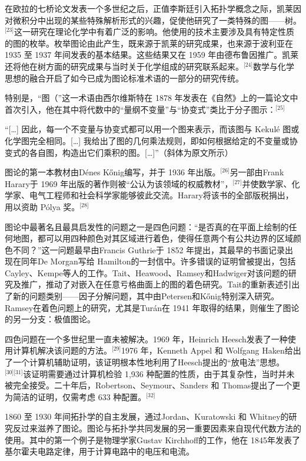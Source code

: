 在欧拉的七桥论文发表一个多世纪之后，正值李斯廷引入拓扑学概念之际，凯莱因对微积分中出现的某些特殊解析形式的兴趣，促使他研究了一类特殊的图——树。\(^\text{[23]}\)这一研究在理论化学中有着广泛的影响。他使用的技术主要涉及具有特定性质的图的枚举。枚举图论由此产生，既来源于凯莱的研究成果，也来源于波利亚在 1935 至 1937 年间发表的基本结果。这些结果又在 1959 年由德布鲁因推广。凯莱还将他在树方面的研究成果与当时关于化学组成的研究联系起来。\(^\text{[24]}\)数学与化学思想的融合开启了如今已成为图论标准术语的一部分的研究传统。

特别是，“图（”这一术语由西尔维斯特在 1878 年发表在《自然》上的一篇论文中首次引入，他在其中将代数中的“量纲不变量”与“协变式”类比于分子图示：\(^\text{[25]}\)

“[…] 因此，每一个不变量与协变式都可以用一个图来表示，而该图与 Kekulé 图或化学图完全相同。[…] 我给出了图的几何乘法规则，即如何根据给定的不变量或协变式的各自图，构造出它们乘积的图。[…]”（斜体为原文所示）

图论的第一本教材由Dénes Kőnig编写，并于 1936 年出版。\(^\text{[26]}\)另一部由Frank Harary于 1969 年出版的著作则被“公认为该领域的权威教材”，\(^\text{[27]}\)并使数学家、化学家、电气工程师和社会科学家能够彼此交流。Harary将该书的全部版税捐出，用以资助 Pólya 奖。\(^\text{[28]}\)

图论中最著名且最具启发性的问题之一是四色问题：“是否真的在平面上绘制的任何地图，都可以用四种颜色对其区域进行着色，使得任意两个有公共边界的区域颜色不同？”这一问题最早由Francis Guthrie于 1852 年提出，其最早的书面记录出现在同年De Morgan写给 Hamilton的一封信中。许多错误的证明曾被提出，包括Cayley、Kempe等人的工作。Tait、Heawood、Ramsey和Hadwiger对该问题的研究及推广，推动了对嵌入在任意亏格曲面上的图的着色研究。Tait的重新表述引出了新的问题类别——因子分解问题，其中由Petersen和Kőnig特别深入研究。Ramsey在着色问题上的研究，尤其是Turán在 1941 年取得的结果，则催生了图论的另一分支：极值图论。

四色问题在一个多世纪里一直未被解决。1969 年，Heinrich Heesch发表了一种使用计算机解决该问题的方法。\(^\text{[29]}\)1976 年，Kenneth Appel 和 Wolfgang Haken给出了一个计算机辅助证明，该证明根本性地利用了Heesch提出的“放电法”思想。\(^\text{[30][31]}\)该证明需要通过计算机检验 1,936 种配置的性质，由于其复杂性，当时并未被完全接受。二十年后，Robertson、Seymour、Sanders 和 Thomas提出了一个更为简洁的证明，仅需考虑 633 种配置。\(^\text{[32]}\)

1860 至 1930 年间拓扑学的自主发展，通过Jordan、Kuratowski 和 Whitney的研究反过来滋养了图论。图论与拓扑学共同发展的另一重要因素来自现代代数方法的使用。其中的第一个例子是物理学家Gustav Kirchhoff的工作，他在 1845年发表了基尔霍夫电路定律，用于计算电路中的电压和电流。

